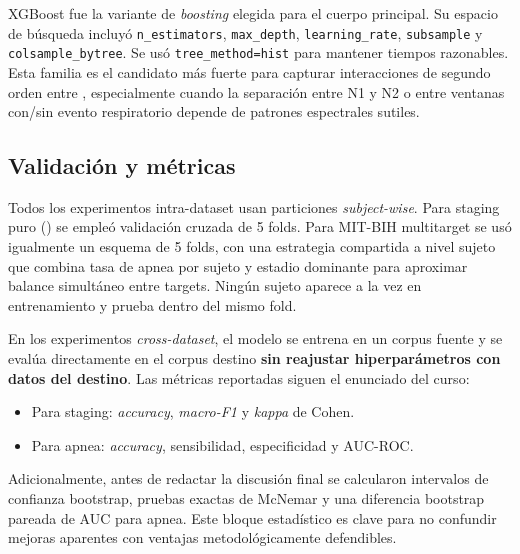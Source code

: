 XGBoost fue la variante de \emph{boosting} elegida para el cuerpo principal. Su espacio de b\'usqueda incluy\'o \texttt{n\_estimators}, \texttt{max\_depth}, \texttt{learning\_rate}, \texttt{subsample} y \texttt{colsample\_bytree}. Se us\'o \texttt{tree\_method=hist} para mantener tiempos razonables. Esta familia es el candidato m\'as fuerte para capturar interacciones de segundo orden entre , especialmente cuando la separaci\'on entre N1 y N2 o entre ventanas con/sin evento respiratorio depende de patrones espectrales sutiles.

\subsection{Validaci\'on y m\'etricas}

Todos los experimentos intra-dataset usan particiones \emph{subject-wise}. Para staging puro () se emple\'o validaci\'on cruzada de 5 folds. Para MIT-BIH multitarget se us\'o igualmente un esquema de 5 folds, con una estrategia compartida a nivel sujeto que combina tasa de apnea por sujeto y estadio dominante para aproximar balance simult\'aneo entre targets. Ning\'un sujeto aparece a la vez en entrenamiento y prueba dentro del mismo fold.

En los experimentos \emph{cross-dataset}, el modelo se entrena en un corpus fuente y se eval\'ua directamente en el corpus destino \textbf{sin reajustar hiperpar\'ametros con datos del destino}. Las m\'etricas reportadas siguen el enunciado del curso:
\begin{itemize}[leftmargin=*]
\item Para staging: \emph{accuracy}, \emph{macro-F1} y \emph{kappa} de Cohen.
\item Para apnea: \emph{accuracy}, sensibilidad, especificidad y AUC-ROC.
\end{itemize}

Adicionalmente, antes de redactar la discusi\'on final se calcularon intervalos de confianza bootstrap, pruebas exactas de McNemar y una diferencia bootstrap pareada de AUC para apnea. Este bloque estad\'istico es clave para no confundir mejoras aparentes con ventajas metodol\'ogicamente defendibles.
